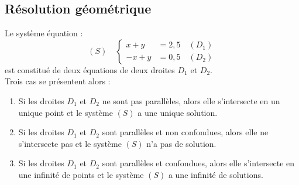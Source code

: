 \documentclass{book}
\begin{document}
\subsection{Résolution géométrique}
Le système équation :
$$(S)\quad \begin{cases}
x+y&=2,5\quad(D_1)\\
-x+y&=0,5\quad(D_2)
\end{cases}$$
est constitué de deux équations de deux droites $D_1$ et $D_2$.\\
Trois cas se présentent alors :
\begin{enumerate}
\item Si les droites $D_1$ et $D_2$ ne sont pas parallèles, alors elle s'intersecte en un unique point et le système $(S)$ a une
unique solution.
\begin{center}
\end{center}
\item Si les droites $D_1$ et $D_2$  sont parallèles et non confondues, alors elle ne s'intersecte pas et le système $(S)$ n'a pas de solution.
\begin{center}
\end{center}
\item Si les droites $D_1$ et $D_2$  sont parallèles et  confondues, alors elle s'intersecte en une infinité de points et le système $(S)$ a une infinité de solutions.
\begin{center}
\end{center}
\end{enumerate} 
\end{document}
